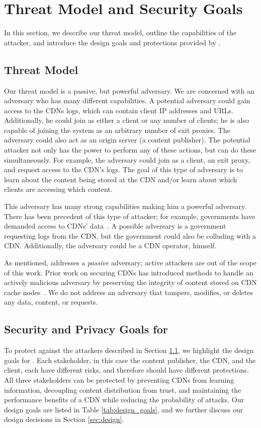 \section{Threat Model and Security Goals}
\label{sec:threat}
In this section, we describe our threat model, outline the capabilities of the 
attacker, and introduce the design goals and protections provided by \system{}.

\subsection{Threat Model}
\label{sec:attacker}

Our threat model is a passive, but powerful adversary.  We are concerned with an 
adversary who has many different capabilities.  A potential adversary could gain 
access to the CDNs logs, which can contain client IP addresses and URLs.  Additionally, 
he could join \system{} as either a client or any number of clients; he is also capable 
of joining the system as an arbitrary number of exit proxies.  The adversary could 
also act as an origin server (a content publisher).  The potential attacker not only has the 
power to perform any of these actions, but can do these simultaneously.  For example, the 
adversary could join as a client, an exit proxy, and request access to the CDN's logs.  The 
goal of this type of adversary is to learn about the content being stored at the CDN and/or 
learn about which clients are accessing which content.  

This adversary has many strong capabilities making him a powerful adversary.  There has been 
precedent of this type of attacker; for example, governments have demanded access to CDNs' 
data~\cite{cloudflare_nsl}.  A possible adversary is a government requesting logs from the CDN, but 
the government could also be colluding with a CDN.  Additionally, the adversary could be a CDN operator, 
himself.  

As mentioned, \system{} addresses a {\it passive} adversary; active attackers are out of the 
scope of this work.  Prior work on securing CDNs has introduced methods to handle an actively 
malicious adversary by preserving the integrity of content stored on CDN cache nodes~\cite{levy2015stickler}.  
We do not address an adversary that tampers, modifies, or deletes any data, content, or requests.  

\subsection{Security and Privacy Goals for \system{}}
\label{sec:goals}
To protect against the attackers described in Section 
\ref{sec:attacker}, we highlight the design goals for \system{}. 
Each stakeholder, in this case the content publisher, the CDN, and the client, each have 
different risks, and therefore should have different protections.  All three stakeholders 
can be protected by preventing CDNs from learning information, decoupling content distribution from trust, and 
maintaining the performance benefits of a CDN while reducing the probability of attacks.  Our design goals are listed in Table \ref{tab:design_goals}, 
and we further discuss our design decisions in Section \ref{sec:design}.

